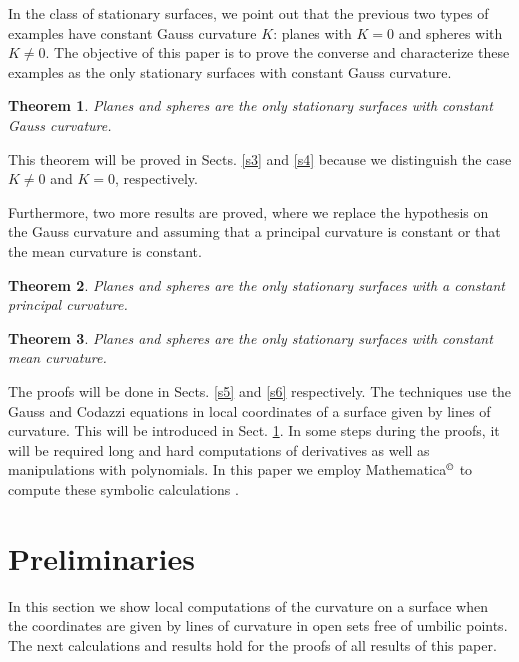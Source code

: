 \documentclass[a4paper,12pt]{amsart}
\newtheorem{theorem}{Theorem}[section]
\theoremstyle{definition}
\begin{document}
In the class of stationary surfaces, we point out that the previous two types of examples have constant Gauss curvature $K$: planes with $K=0$ and spheres with  $K\not=0$.  The objective of this paper is to  prove the converse and  characterize these examples as the only  stationary surfaces with constant Gauss curvature.   

\begin{theorem} \label{t1} Planes and spheres are the only stationary surfaces   with   constant Gauss curvature.
\end{theorem}

 This theorem will be proved in Sects. \ref{s3} and \ref{s4} because we distinguish the case $K\not=0$ and $K=0$, respectively. 

Furthermore, two more results are proved, where we replace the hypothesis on  the Gauss curvature and  assuming that a principal curvature is constant or that the mean curvature is constant. 
 

\begin{theorem} \label{t22} Planes and spheres are the only  stationary surfaces with a constant principal      curvature. 
\end{theorem}

 
\begin{theorem} \label{t3} Planes and spheres are the only   stationary surfaces with constant mean curvature.   
\end{theorem}

The proofs will be done in Sects. \ref{s5} and \ref{s6} respectively. The techniques use  the Gauss and Codazzi equations in local coordinates of a surface given by lines of curvature. This will be introduced in Sect. \ref{s2}. In some steps during  the proofs, it will be  required long and hard computations of derivatives as well as  manipulations with polynomials. In this paper we employ {\sc Mathematica}$^\copyright$ to compute these symbolic calculations \cite{wo}.

\section{Preliminaries}\label{s2}

In this section we show local computations of the curvature on a surface when the coordinates are given by lines of curvature in open sets   free of umbilic points. The next calculations and results hold for the proofs of all results of this paper.
\end{document}
